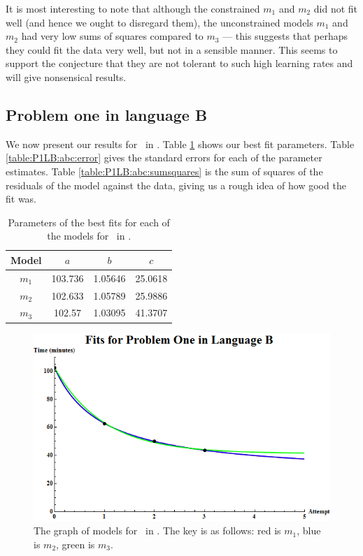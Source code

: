 It is most interesting to note that although the constrained $m_1$ and $m_2$ did
not fit well (and hence we ought to disregard them),
the unconstrained models $m_1$ and $m_2$ had very low sums of
squares compared to $m_3$ --- this suggests that perhaps they could fit the data
very well, but not in a sensible manner.
This seems to support the conjecture that they are not tolerant to such high
learning rates and will give nonsensical results.

\subsection{Problem one in language B} \label{subsecP1LB}

We now present our results for \PO\ in \LB.
Table \ref{table:P1LB:abc} shows our best fit parameters.
Table \ref{table:P1LB:abc:error} gives the standard errors for each of the
parameter estimates.
Table \ref{table:P1LB:abc:sumsquares} is the sum of squares of the residuals of
the model against the data, giving us a rough idea of how good the fit was.

\begin{table}[ht!]
\centering
\begin{tabular}{|c|c|c|c|}
\hline
{\bf Model} &  $a$ & $b$ & $c$ \\
\hline
$m_1$ & 103.736 & 1.05646 & 25.0618 \\
\hline
$m_2$ & 102.633 & 1.05789 & 25.9886\\
\hline
$m_3$ & 102.57 & 1.03095 & 41.3707 \\
\hline
\end{tabular}
\caption{Parameters of the best fits for each of the models for \PO\ in \LB.}
\label{table:P1LB:abc}
\end{table}

\begin{figure}[ht!]
\centering
\includegraphics[scale=0.65]{./media/P1LBGraph.png}
\caption{The graph of models for \PO\ in \LB. The key is as follows:
		 red is $m_1$,
		 blue is $m_2$,
		 green is $m_3$.
}
	\label{figure:P1LB:abc}
\end{figure}

